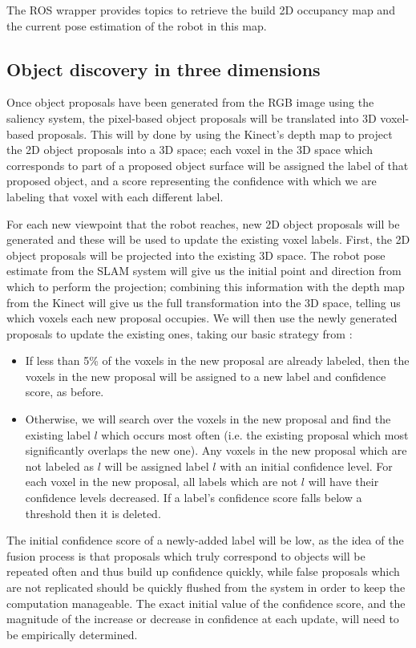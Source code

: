 \documentclass[a4paper,11pt,english]{article}
\begin{document}
The ROS wrapper provides topics to retrieve the build 2D occupancy map and the current pose estimation of the robot in this map.

\subsection{Object discovery in three dimensions}
\label{system:fusion}
Once object proposals have been generated from the RGB image using the saliency system, the pixel-based object proposals will be translated into 3D voxel-based proposals.
This will by done by using the Kinect's depth map to project the 2D object proposals into a 3D space; each voxel in the 3D space which corresponds to part of a proposed object surface will be assigned the label of that proposed object, and a score representing the confidence with which we are labeling that voxel with each different label.

For each new viewpoint that the robot reaches, new 2D object proposals will be generated and these will be used to update the existing voxel labels.
First, the 2D object proposals will be projected into the existing 3D space.
The robot pose estimate from the SLAM system will give us the initial point and direction from which to perform the projection; combining this information with the depth map from the Kinect will give us the full transformation into the 3D space, telling us which voxels each new proposal occupies.
We will then use the newly generated proposals to update the existing ones, taking our basic strategy from \cite{garcia2013computational}:

\begin{itemize}
	\item If less than 5\% of the voxels in the new proposal are already labeled, then the voxels in the new proposal will be assigned to a new label and confidence score, as before.
	\item Otherwise, we will search over the voxels in the new proposal and find the existing label \(l\) which occurs most often (i.e. the existing proposal which most significantly overlaps the new one).
	Any voxels in the new proposal which are not labeled as \(l\) will be assigned label \(l\) with an initial confidence level.
	For each voxel in the new proposal, all labels which are not \(l\) will have their confidence levels decreased.
	If a label's confidence score falls below a threshold then it is deleted.
\end{itemize}

The initial confidence score of a newly-added label will be low, as the idea of the fusion process is that proposals which truly correspond to objects will be repeated often and thus build up confidence quickly, while false proposals which are not replicated should be quickly flushed from the system in order to keep the computation manageable.
The exact initial value of the confidence score, and the magnitude of the increase or decrease in confidence at each update, will need to be empirically determined.
\end{document}
